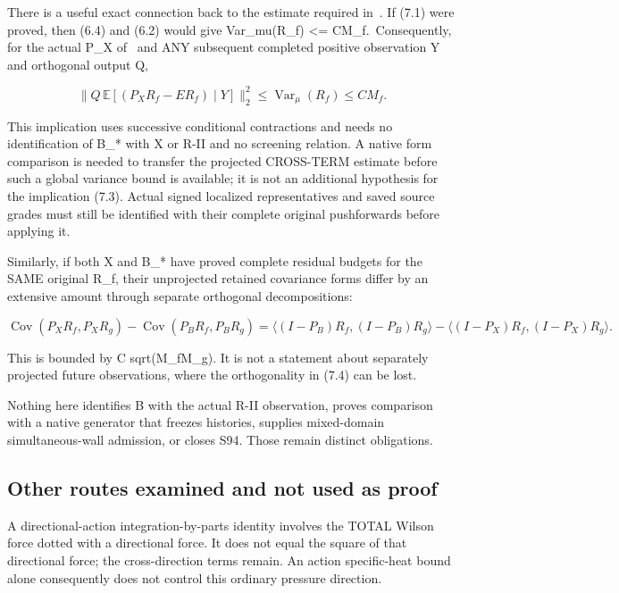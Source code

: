 \documentclass[
  11pt,
]{article}
\begin{document}
There is a useful exact connection back to the estimate required in~\cite{CT}. If
(7.1) were proved, then (6.4) and (6.2) would give Var\_mu(R\_f)
\textless= CM\_f.~Consequently, for the actual P\_X of~\cite{CT} and ANY subsequent
completed positive observation Y and orthogonal output Q,

\[
 \|Q\,\mathbb E[(P_XR_f-ER_f)\mid Y]\|_2^2
 \le\operatorname{Var}_\mu(R_f)\le CM_f.
 \tag{7.3}
\]

This implication uses successive conditional contractions and needs no
identification of B\_* with X or R-II and no screening relation. A
native form comparison is needed to transfer the projected CROSS-TERM
estimate before such a global variance bound is available; it is not an
additional hypothesis for the implication (7.3). Actual signed localized
representatives and saved source grades must still be identified with
their complete original pushforwards before applying it.

Similarly, if both X and B\_* have proved complete residual budgets for
the SAME original R\_f, their unprojected retained covariance forms
differ by an extensive amount through separate orthogonal
decompositions:

\[
 \operatorname{Cov}(P_XR_f,P_XR_g)
 -\operatorname{Cov}(P_BR_f,P_BR_g)
 =\langle(I-P_B)R_f,(I-P_B)R_g\rangle
  -\langle(I-P_X)R_f,(I-P_X)R_g\rangle.
 \tag{7.4}
\]

This is bounded by C sqrt(M\_fM\_g). It is not a statement about
separately projected future observations, where the orthogonality in
(7.4) can be lost.

Nothing here identifies B with the actual R-II observation, proves
comparison with a native generator that freezes histories, supplies
mixed-domain simultaneous-wall admission, or closes S94. Those remain
distinct obligations.

\hypertarget{other-routes-examined-and-not-used-as-proof}{%
\subsection{Other routes examined and not used as
proof}\label{other-routes-examined-and-not-used-as-proof}}

A directional-action integration-by-parts identity involves the TOTAL
Wilson force dotted with a directional force. It does not equal the
square of that directional force; the cross-direction terms remain. An
action specific-heat bound alone consequently does not control this
ordinary pressure direction.
\end{document}
